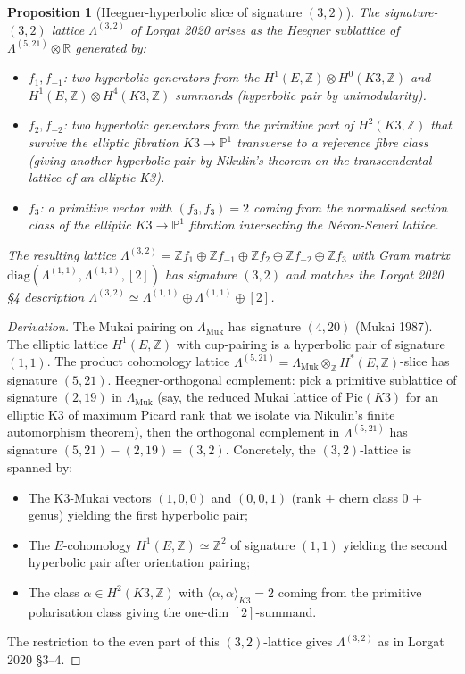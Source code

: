 \documentclass[11pt]{amsart}
\providecommand{\R}{\mathbb{R}}
\providecommand{\Z}{\mathbb{Z}}
\providecommand{\Muk}{\Lambda_{\mathrm{Muk}}}
\providecommand{\LamF}{\Lambda^{(3,2)}}
\theoremstyle{plain}
\newtheorem{proposition}[theorem]{Proposition}
\theoremstyle{definition}
\theoremstyle{remark}
\begin{document}
\begin{proposition}[Heegner-hyperbolic slice of signature $(3,2)$]
\label{prop:heegner-slice}
The signature-$(3,2)$ lattice $\LamF$ of Lorgat 2020 arises as the
Heegner sublattice of
$\Lambda^{(5, 21)}\otimes \R$ generated by:
\begin{itemize}
\item $f_{1}, f_{-1}$: two hyperbolic generators from the
$H^{1}(E,\Z)\otimes H^{0}(K3,\Z)$ and $H^{1}(E,\Z)\otimes H^{4}(K3,\Z)$
summands (hyperbolic pair by unimodularity).
\item $f_{2}, f_{-2}$: two hyperbolic generators from the primitive
part of $H^{2}(K3, \Z)$ that survive the elliptic fibration
$K3 \to \mathbb{P}^{1}$ transverse to a reference fibre class
(giving another hyperbolic pair by Nikulin's theorem on the
transcendental lattice of an elliptic K3).
\item $f_{3}$: a primitive vector with $(f_{3}, f_{3}) = 2$ coming from
the normalised section class of the elliptic $K3 \to \mathbb{P}^{1}$
fibration intersecting the N\'eron-Severi lattice.
\end{itemize}
The resulting lattice $\LamF = \Z f_{1} \oplus \Z f_{-1} \oplus \Z f_{2}
\oplus \Z f_{-2} \oplus \Z f_{3}$ with Gram matrix $\mathrm{diag}
(\Lambda^{(1,1)}, \Lambda^{(1,1)}, [2])$ has signature $(3,2)$ and
matches the Lorgat 2020 \S4 description $\LamF \simeq \Lambda^{(1,1)}
\oplus \Lambda^{(1,1)}\oplus [2]$.
\end{proposition}

\begin{proof}[Derivation]
The Mukai pairing on $\Muk$ has signature $(4,20)$ (Mukai 1987). The
elliptic lattice $H^{1}(E,\Z)$ with cup-pairing is a hyperbolic pair
of signature $(1,1)$. The product cohomology lattice $\Lambda^{(5,21)}
= \Muk \otimes_{\Z} H^{\ast}(E,\Z)$-slice has signature $(5, 21)$.
Heegner-orthogonal complement: pick a primitive sublattice of signature
$(2,19)$ in $\Muk$ (say, the reduced Mukai lattice of Pic$(K3)$ for an
elliptic K3 of maximum Picard rank that we isolate via Nikulin's finite
automorphism theorem), then the orthogonal complement in
$\Lambda^{(5,21)}$ has signature $(5,21)-(2,19)=(3,2)$. Concretely, the
$(3,2)$-lattice is spanned by:
\begin{itemize}
\item The K3-Mukai vectors $(1,0,0)$ and $(0,0,1)$ (rank + chern class
$0$ + genus) yielding the first hyperbolic pair;
\item The $E$-cohomology $H^{1}(E, \Z)\simeq\Z^{2}$ of signature
$(1,1)$ yielding the second hyperbolic pair after orientation pairing;
\item The class $\alpha\in H^{2}(K3,\Z)$ with
$\langle\alpha,\alpha\rangle_{K3} = 2$ coming from the primitive
polarisation class giving the one-dim $[2]$-summand.
\end{itemize}
The restriction to the even part of this $(3,2)$-lattice gives $\LamF$
as in Lorgat 2020 \S3--4.
\end{proof}
\end{document}
